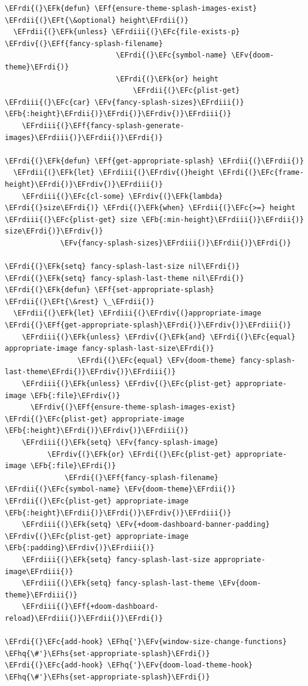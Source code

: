 \documentclass{scrartcl}
\newcommand{\EFk}[1]{\textcolor{EFk}{#1}} %
\newcommand{\EFt}[1]{\textcolor{EFt}{#1}} %
\newcommand{\EFb}[1]{\textcolor{EFb}{#1}} %
\newcommand{\EFc}[1]{\textcolor{EFc}{#1}} %
\newcommand{\EFv}[1]{\textcolor{EFv}{#1}} %
\newcommand{\EFf}[1]{\textcolor{EFf}{#1}} %
\newcommand{\EFhq}[1]{#1} %
\newcommand{\EFhs}[1]{#1} %
\newcommand{\EFrdi}[1]{#1} %
\newcommand{\EFrdii}[1]{#1} %
\newcommand{\EFrdiii}[1]{#1} %
\newcommand{\EFrdiv}[1]{#1} %
\begin{document}
\begin{Code}
\begin{Verbatim}[]
\EFrdi{(}\EFk{defun} \EFf{ensure-theme-splash-images-exist} \EFrdii{(}\EFt{\&optional} height\EFrdii{)}
  \EFrdii{(}\EFk{unless} \EFrdiii{(}\EFc{file-exists-p} \EFrdiv{(}\EFf{fancy-splash-filename}
                          \EFrdi{(}\EFc{symbol-name} \EFv{doom-theme}\EFrdi{)}
                          \EFrdi{(}\EFk{or} height
                              \EFrdii{(}\EFc{plist-get} \EFrdiii{(}\EFc{car} \EFv{fancy-splash-sizes}\EFrdiii{)} \EFb{:height}\EFrdii{)}\EFrdi{)}\EFrdiv{)}\EFrdiii{)}
    \EFrdiii{(}\EFf{fancy-splash-generate-images}\EFrdiii{)}\EFrdii{)}\EFrdi{)}

\EFrdi{(}\EFk{defun} \EFf{get-appropriate-splash} \EFrdii{(}\EFrdii{)}
  \EFrdii{(}\EFk{let} \EFrdiii{(}\EFrdiv{(}height \EFrdi{(}\EFc{frame-height}\EFrdi{)}\EFrdiv{)}\EFrdiii{)}
    \EFrdiii{(}\EFc{cl-some} \EFrdiv{(}\EFk{lambda} \EFrdi{(}size\EFrdi{)} \EFrdi{(}\EFk{when} \EFrdii{(}\EFc{>=} height \EFrdiii{(}\EFc{plist-get} size \EFb{:min-height}\EFrdiii{)}\EFrdii{)} size\EFrdi{)}\EFrdiv{)}
             \EFv{fancy-splash-sizes}\EFrdiii{)}\EFrdii{)}\EFrdi{)}

\EFrdi{(}\EFk{setq} fancy-splash-last-size nil\EFrdi{)}
\EFrdi{(}\EFk{setq} fancy-splash-last-theme nil\EFrdi{)}
\EFrdi{(}\EFk{defun} \EFf{set-appropriate-splash} \EFrdii{(}\EFt{\&rest} \_\EFrdii{)}
  \EFrdii{(}\EFk{let} \EFrdiii{(}\EFrdiv{(}appropriate-image \EFrdi{(}\EFf{get-appropriate-splash}\EFrdi{)}\EFrdiv{)}\EFrdiii{)}
    \EFrdiii{(}\EFk{unless} \EFrdiv{(}\EFk{and} \EFrdi{(}\EFc{equal} appropriate-image fancy-splash-last-size\EFrdi{)}
                 \EFrdi{(}\EFc{equal} \EFv{doom-theme} fancy-splash-last-theme\EFrdi{)}\EFrdiv{)}\EFrdiii{)}
    \EFrdiii{(}\EFk{unless} \EFrdiv{(}\EFc{plist-get} appropriate-image \EFb{:file}\EFrdiv{)}
      \EFrdiv{(}\EFf{ensure-theme-splash-images-exist} \EFrdi{(}\EFc{plist-get} appropriate-image \EFb{:height}\EFrdi{)}\EFrdiv{)}\EFrdiii{)}
    \EFrdiii{(}\EFk{setq} \EFv{fancy-splash-image}
          \EFrdiv{(}\EFk{or} \EFrdi{(}\EFc{plist-get} appropriate-image \EFb{:file}\EFrdi{)}
              \EFrdi{(}\EFf{fancy-splash-filename} \EFrdii{(}\EFc{symbol-name} \EFv{doom-theme}\EFrdii{)} \EFrdii{(}\EFc{plist-get} appropriate-image \EFb{:height}\EFrdii{)}\EFrdi{)}\EFrdiv{)}\EFrdiii{)}
    \EFrdiii{(}\EFk{setq} \EFv{+doom-dashboard-banner-padding} \EFrdiv{(}\EFc{plist-get} appropriate-image \EFb{:padding}\EFrdiv{)}\EFrdiii{)}
    \EFrdiii{(}\EFk{setq} fancy-splash-last-size appropriate-image\EFrdiii{)}
    \EFrdiii{(}\EFk{setq} fancy-splash-last-theme \EFv{doom-theme}\EFrdiii{)}
    \EFrdiii{(}\EFf{+doom-dashboard-reload}\EFrdiii{)}\EFrdii{)}\EFrdi{)}

\EFrdi{(}\EFc{add-hook} \EFhq{'}\EFv{window-size-change-functions} \EFhq{\#'}\EFhs{set-appropriate-splash}\EFrdi{)}
\EFrdi{(}\EFc{add-hook} \EFhq{'}\EFv{doom-load-theme-hook} \EFhq{\#'}\EFhs{set-appropriate-splash}\EFrdi{)}
\end{Verbatim}
\end{Code}
\end{document}
